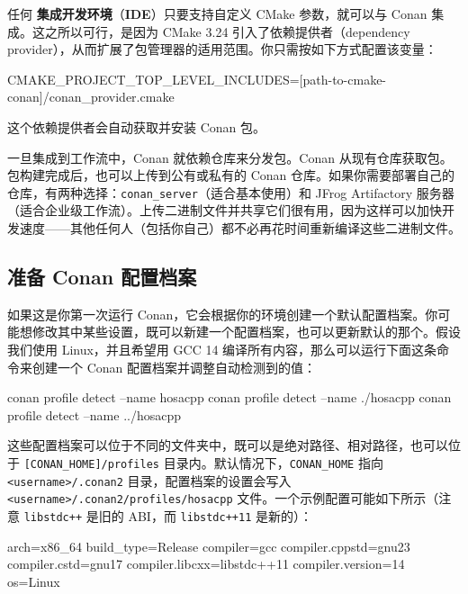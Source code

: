 任何 \textbf{集成开发环境}（\textbf{IDE}）只要支持自定义 CMake 参数，就可以与 Conan 集成。这之所以可行，是因为 CMake 3.24 引入了依赖提供者（dependency provider），从而扩展了包管理器的适用范围。你只需按如下方式配置该变量：

\begin{codebox}[text]
CMAKE_PROJECT_TOP_LEVEL_INCLUDES=[path-to-cmake-conan]/conan_provider.cmake 
\end{codebox}

这个依赖提供者会自动获取并安装 Conan 包。

一旦集成到工作流中，Conan 就依赖仓库来分发包。Conan 从现有仓库获取包。包构建完成后，也可以上传到公有或私有的 Conan 仓库。如果你需要部署自己的仓库，有两种选择：\texttt{conan\_\allowbreak{}server}（适合基本使用）和 JFrog Artifactory 服务器（适合企业级工作流）。上传二进制文件并共享它们很有用，因为这样可以加快开发速度——其他任何人（包括你自己）都不必再花时间重新编译这些二进制文件。

\subsection{准备 Conan 配置档案}

\label{idx:726}
如果这是你第一次运行 Conan，它会根据你的环境创建一个默认配置档案。你可能想修改其中某些设置，既可以新建一个配置档案，也可以更新默认的那个。假设我们使用 Linux，并且希望用 GCC 14 编译所有内容，那么可以运行下面这条命令来创建一个 Conan 配置档案并调整自动检测到的值：

\begin{codebox}[text]
conan profile detect --name hosacpp
conan profile detect --name ./hosacpp
conan profile detect --name ../hosacpp
\end{codebox}

这些配置档案可以位于不同的文件夹中，既可以是绝对路径、相对路径，也可以位于 \texttt{[CONAN\_\allowbreak{}HOME]/\allowbreak{}profiles} 目录内。默认情况下，\texttt{CONAN\_\allowbreak{}HOME} 指向 \texttt{<username>/\allowbreak{}.\allowbreak{}conan2} 目录，配置档案的设置会写入 \texttt{<username>/\allowbreak{}.\allowbreak{}conan2/\allowbreak{}profiles/\allowbreak{}hosacpp} 文件。一个示例配置可能如下所示（注意 \texttt{libstdc++} 是旧的 ABI，而 \texttt{libstdc+\allowbreak{}+\allowbreak{}11} 是新的）：

\begin{codebox}[text]
[settings]
arch=x86_64
build_type=Release
compiler=gcc
compiler.cppstd=gnu23
compiler.cstd=gnu17
compiler.libcxx=libstdc++11
compiler.version=14
os=Linux
\end{codebox}


